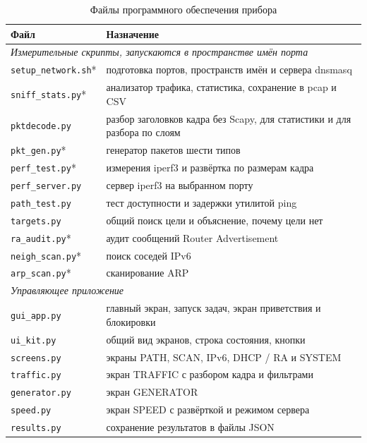 \begin{table}[htbp]
    \caption{Файлы программного обеспечения прибора}
    \label{tab:soubory}
    \centering
    \small
    \begin{tabular}{lp{9.5cm}}
        \hline
        Файл & Назначение \\
        \hline
        \multicolumn{2}{l}{\textit{Измерительные скрипты, запускаются в пространстве имён порта}} \\
        \texttt{setup\_network.sh}* & подготовка портов, пространств имён и сервера dnsmasq \\
        \texttt{sniff\_stats.py}* & анализатор трафика, статистика, сохранение в pcap и CSV \\
        \texttt{pktdecode.py} & разбор заголовков кадра без Scapy, для статистики и для разбора по слоям \\
        \texttt{pkt\_gen.py}* & генератор пакетов шести типов \\
        \texttt{perf\_test.py}* & измерения iperf3 и развёртка по размерам кадра \\
        \texttt{perf\_server.py} & сервер iperf3 на выбранном порту \\
        \texttt{path\_test.py} & тест доступности и задержки утилитой ping \\
        \texttt{targets.py} & общий поиск цели и объяснение, почему цели нет \\
        \texttt{ra\_audit.py}* & аудит сообщений Router Advertisement \\
        \texttt{neigh\_scan.py}* & поиск соседей IPv6 \\
        \texttt{arp\_scan.py}* & сканирование ARP \\
        \multicolumn{2}{l}{\textit{Управляющее приложение}} \\
        \texttt{gui\_app.py} & главный экран, запуск задач, экран приветствия и блокировки \\
        \texttt{ui\_kit.py} & общий вид экранов, строка состояния, кнопки \\
        \texttt{screens.py} & экраны PATH, SCAN, IPv6, DHCP / RA и SYSTEM \\
        \texttt{traffic.py} & экран TRAFFIC с разбором кадра и фильтрами \\
        \texttt{generator.py} & экран GENERATOR \\
        \texttt{speed.py} & экран SPEED с развёрткой и режимом сервера \\
        \texttt{results.py} & сохранение результатов в файлы JSON \\

\end{tabular}
\end{table}

